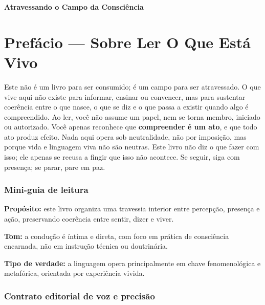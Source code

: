 \documentclass[12pt]{book}
\begin{document}
\pagestyle{plain}

\begin{titlepage}
\thispagestyle{empty}
\vspace*{\fill}
\begin{center}
{\Huge\bfseries Atravessando o Campo da Consciência\par}
\end{center}
\vspace*{\fill}
\end{titlepage}

\tableofcontents
\clearpage

\chapter*{Prefácio --- Sobre Ler O Que Está Vivo}

Este não é um livro para ser consumido; é um campo para ser atravessado. O que vive aqui não existe para informar, ensinar ou convencer, mas para sustentar coerência entre o que nasce, o que se diz e o que passa a existir quando algo é compreendido. Ao ler, você não assume um papel, nem se torna membro, iniciado ou autorizado. Você apenas reconhece que \textbf{compreender é um ato}, e que todo ato produz efeito. Nada aqui opera sob neutralidade, não por imposição, mas porque vida e linguagem viva não são neutras. Este livro não diz o que fazer com isso; ele apenas se recusa a fingir que isso não acontece. Se seguir, siga com presença; se parar, pare em paz.

\subsection*{Mini-guia de leitura}

\textbf{Propósito:} este livro organiza uma travessia interior entre percepção, presença e ação, preservando coerência entre sentir, dizer e viver.

\textbf{Tom:} a condução é íntima e direta, com foco em prática de consciência encarnada, não em instrução técnica ou doutrinária.

\textbf{Tipo de verdade:} a linguagem opera principalmente em chave fenomenológica e metafórica, orientada por experiência vivida.

\subsection*{Contrato editorial de voz e precisão}
\end{document}
